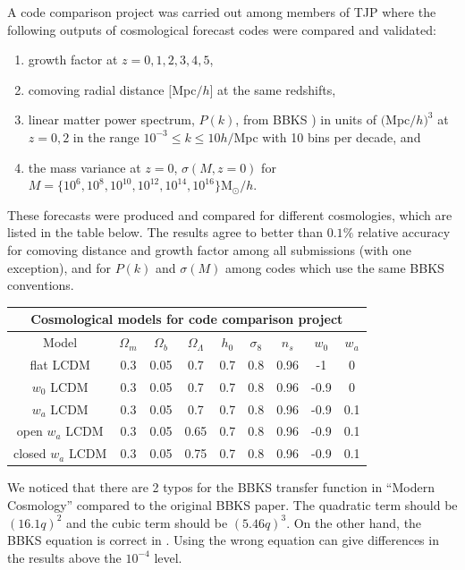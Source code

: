 \documentclass[\docopts]{\docclass}
\begin{document}
A code comparison project was carried out among members of TJP where the following outputs of cosmological forecast codes were compared and validated:
\begin{enumerate}
\item growth factor at $z = 0,1,2,3,4,5$,
\item comoving radial distance $[$Mpc$/h]$ at the same redshifts, 
\item linear matter power spectrum, $P(k)$, from BBKS \citealt{BBKS}) in units of $($Mpc$/h)^3$ at $z=0,2$ in the range $10^{-3} \leq k \leq 10 h/$Mpc with 10 bins per decade, and
\item the mass variance at $z=0$, $\sigma(M,z=0)$ for $M =\{10^6, 10^8, 10^{10}, 10^{12}, 10^{14}, 10^{16}\} $M$_\odot/h$.
\end{enumerate}
These forecasts were produced and compared for different cosmologies, which are listed in the table below. The results agree to better than $0.1\%$ relative accuracy for comoving distance and growth factor among all submissions (with one exception), and for $P(k)$ and $\sigma(M)$ among codes which use the same BBKS conventions. 

\begin{center}
  \begin{tabular}{ c | c c c c c c c c }
    \hline
    \multicolumn{9}{|c|}{Cosmological models for code comparison project} \\
    \hline
    \hline
    Model & $\Omega_m$ & $\Omega_b$ & $\Omega_\Lambda$ & $h_0$ & $\sigma_8$ & $n_s$ & $w_0$ & $w_a$ \\
    \hline
    flat LCDM & 0.3 & 0.05 & 0.7 & 0.7 & 0.8 & 0.96 & -1 & 0 \\ 
    $w_0$ LCDM & 0.3 & 0.05 & 0.7 & 0.7 & 0.8 & 0.96 & -0.9 & 0  \\ 
    $w_a$ LCDM & 0.3 & 0.05 & 0.7 & 0.7 & 0.8 & 0.96 & -0.9 & 0.1  \\ 
    open $w_a$ LCDM & 0.3 & 0.05 & 0.65 & 0.7 & 0.8 & 0.96 & -0.9 & 0.1  \\ 
    closed $w_a$ LCDM & 0.3 & 0.05 & 0.75 & 0.7 & 0.8 & 0.96 & -0.9 & 0.1  \\
    \hline
  \end{tabular}
\end{center}

We noticed that there are 2 typos for the BBKS transfer function in ``Modern Cosmology'' \citep{DodelsonBook} compared to the original BBKS paper. The quadratic term should be $(16.1q)^2$ and the cubic term should be $(5.46q)^3$. On the other hand, the BBKS equation is correct in \citet{PeacockBook}. Using the wrong equation can give differences in the results above the $10^{-4}$ level.
\end{document}
